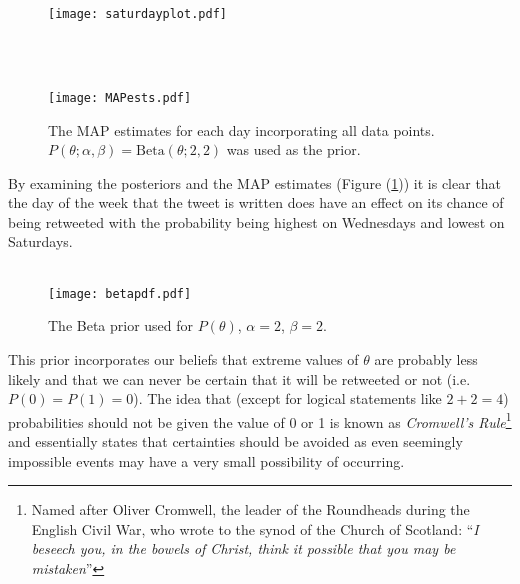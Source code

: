 \documentclass[paper=a4, fontsize=11pt]{scrartcl} %
\numberwithin{equation}{section} %
\numberwithin{figure}{section} %
\numberwithin{table}{section} %
\begin{document}
\newpage
\begin{figure}[!h]
\centering
\texttt{[image: saturdayplot.pdf]}%
\end{figure}

\
\\
\\


\begin{figure}[!h]
\centering
\texttt{[image: MAPests.pdf]}%
\caption{The MAP estimates for each day incorporating all data points. $P(\theta ; \alpha, \beta)= \textrm{Beta}(\theta ; 2,2)$ was used as the prior.}
  \label{fig:mapests}
\end{figure}

By examining the posteriors and the MAP estimates (Figure (\ref{fig:mapests})) it is clear that the day of the week that the tweet is written does have an effect on its chance of being retweeted with the probability being highest on Wednesdays and lowest on Saturdays.\\
\newpage
{}\\


\begin{figure}[!h]
\centering
\texttt{[image: betapdf.pdf]}%
\caption{The Beta prior used for $P(\theta)$, $\alpha=2$, $\beta=2$.}
  \label{fig:betaprior}
\end{figure}

This prior incorporates our beliefs that extreme values of $\theta$ are probably less likely and that we can never be certain that it will be retweeted or not (i.e. $P(0)=P(1)=0$). The idea that (except for logical statements like $2+2=4$) probabilities should not be given the value of 0 or 1 is known as \textit{Cromwell's Rule}\footnote{Named after Oliver Cromwell, the leader of the Roundheads during the English Civil War, who wrote to the synod of the Church of Scotland:  ``\textit{I beseech you, in the bowels of Christ, think it possible that you may be mistaken}'' } and essentially states that certainties should be avoided as even seemingly impossible events may have a very small possibility of occurring.\\
\end{document}
